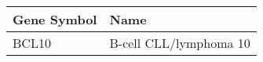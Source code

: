 \begin{tabular}{ll}
\toprule
Gene Symbol &                   Name \\
\midrule
      BCL10 & B-cell CLL/lymphoma 10 \\
\bottomrule
\end{tabular}
